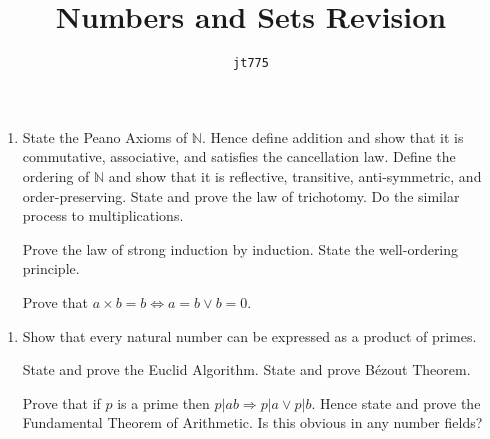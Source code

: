 \documentclass[11pt]{article}
\title{\textbf{Numbers and Sets Revision}}
\author{\texttt{jt775}}
\date{\null}
\newlength{\qspace}
\newcounter{qnumber}
\newenvironment{question}%
 {\vspace{\qspace}
  \begin{enumerate}[\bfseries 1\quad][10]%
    \setcounter{enumi}{\value{qnumber}}%
    \item%
 }
{
  \end{enumerate}
  \filbreak
  \stepcounter{qnumber}
 }
\begin{document}
\maketitle
\vspace{-1.5cm}
\begin{question}
    State the Peano Axioms of $ \mathbb{N} $. Hence define addition and show that it is commutative, associative, and satisfies the cancellation law. Define the ordering of $ \mathbb{N} $ and show that it is reflective, transitive, anti-symmetric, and order-preserving. State and prove the law of trichotomy. Do the similar process to multiplications.

    Prove the law of strong induction by induction. State the well-ordering principle.

    Prove that $ a\times b=b \Leftrightarrow a=b \lor b=0 $.
\end{question}
\begin{question}
  Show that every natural number can be expressed as a product of primes. 
  
  State and prove the Euclid Algorithm. State and prove B\'{e}zout Theorem.

  Prove that if $p$ is a prime then $ p|ab \Rightarrow p|a \lor p|b $. Hence state and prove the Fundamental Theorem of Arithmetic. Is this obvious in any number fields?
\end{question}
\end{document}
